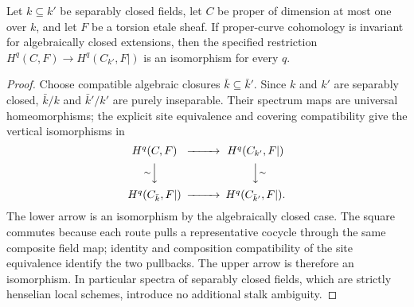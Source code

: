 \begin{lemma}
\label{lemma:weil-pbc-curve-separably-closed-passage}
\uses{}

Let $k\subseteq k'$ be separably closed fields, let $C$ be proper of
dimension at most one over $k$, and let $F$ be a torsion etale sheaf.  If
proper-curve cohomology is invariant for algebraically closed extensions,
then the specified restriction
$H^q(C,F)\to H^q(C_{k'},F|)$ is an isomorphism for every $q$.
\end{lemma}
\begin{proof}

Choose compatible algebraic closures $\bar k\subseteq\bar k'$.  Since $k$
and $k'$ are separably closed, $\bar k/k$ and $\bar k'/k'$ are purely
inseparable.  Their spectrum maps are universal homeomorphisms; the explicit
site equivalence and covering compatibility give the vertical isomorphisms
in
\[
\begin{CD}
 H^q(C,F) @>>> H^q(C_{k'},F|)\\
 @V{\sim}VV @VV{\sim}V\\
 H^q(C_{\bar k},F|) @>>> H^q(C_{\bar k'},F|).
\end{CD}
\]
The lower arrow is an isomorphism by the algebraically closed case.  The
square commutes because each route pulls a representative cocycle through
the same composite field map; identity and composition compatibility of the
site equivalence identify the two pullbacks.  The upper arrow is therefore
an isomorphism.  In particular spectra of separably closed fields, which are
strictly henselian local schemes, introduce no additional stalk ambiguity.
\end{proof}

